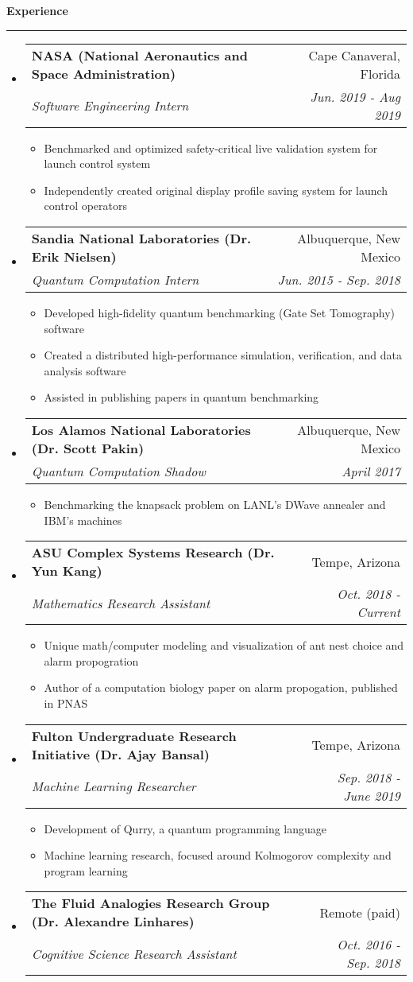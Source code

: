 \documentclass[letterpaper,11pt]{article}
\makeatletter
\newcommand{\sectionline}{
    \noindent\rule[0.5ex]{\linewidth}{0.5pt}
}
\newcommand{\resitem}[1]{\item #1 \vspace{-3pt}}
\newcommand{\resheading}[1]{
    {\large \textbf{#1}}
    \sectionline
}
\newcommand{\colfill}{@{\extracolsep{\fill}}}
\newcommand{\ressubheading}[4]{
\begin{tabular*}{6.5in}{l\colfill r}
		\textbf{#1} & #2 \\
		\textit{#3} & \textit{#4} \\
\end{tabular*}\vspace{-6pt}}
\makeatother
\begin{document}
\resheading{Experience}
\begin{itemize}
 \item
     \ressubheading{NASA (National Aeronautics and Space Administration)}{Cape Canaveral, Florida}{Software Engineering Intern}{Jun. 2019 - Aug 2019}
 	\begin{itemize}
        \resitem{Benchmarked and optimized safety-critical live validation system for launch control system}
 		\resitem{Independently created original display profile saving system for launch control operators}
 	\end{itemize}
 \item
    \ressubheading{Sandia National Laboratories (Dr. Erik Nielsen)}{Albuquerque, New Mexico}{Quantum Computation Intern}{Jun. 2015 - Sep. 2018}
 	\begin{itemize}
        \resitem{Developed high-fidelity quantum benchmarking (Gate Set Tomography) software}
 		\resitem{Created a distributed high-performance simulation, verification, and data analysis software}
 		\resitem{Assisted in publishing papers in quantum benchmarking}
 	\end{itemize}
 \item
     \ressubheading{Los Alamos National Laboratories (Dr. Scott Pakin)}{Albuquerque, New Mexico}{Quantum Computation Shadow}{April 2017}
 	\begin{itemize}
 		\resitem{Benchmarking the knapsack problem on LANL's DWave annealer and IBM's machines}
 	\end{itemize}
 \item
    \ressubheading{ASU Complex Systems Research (Dr. Yun Kang)}{Tempe, Arizona}{Mathematics Research Assistant}{Oct. 2018 - Current}
 	\begin{itemize}
 		\resitem{Unique math/computer modeling and visualization of ant nest choice and alarm propogration}
        \resitem{Author of a computation biology paper on alarm propogation, published in PNAS}
 	\end{itemize}
 \item
     \ressubheading{Fulton Undergraduate Research Initiative (Dr. Ajay Bansal)}{Tempe, Arizona}{Machine Learning Researcher}{Sep. 2018 - June 2019}
 	\begin{itemize}
        \resitem{Development of Qurry, a quantum programming language}
        \resitem{Machine learning research, focused around Kolmogorov complexity and program learning}
 	\end{itemize}
 \item
    \ressubheading{The Fluid Analogies Research Group (Dr. Alexandre Linhares)}{Remote (paid)}{Cognitive Science Research Assistant}{Oct. 2016 - Sep. 2018}

\end{itemize}
\end{document}
